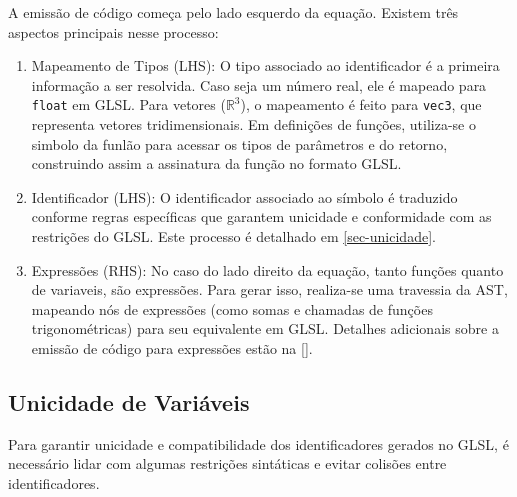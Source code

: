 A emissão de código começa pelo lado esquerdo da equação. Existem três aspectos principais nesse processo:
\begin{enumerate}
    \item Mapeamento de Tipos (LHS): O tipo associado ao identificador é a primeira informação a ser resolvida. Caso seja um número real, ele é mapeado para \verb"float" em GLSL. Para vetores ($\mathbb{R}^3$), o mapeamento é feito para \verb"vec3", que representa vetores tridimensionais. Em definições de funções, utiliza-se o simbolo da funlão para acessar os tipos de parâmetros e do retorno, construindo assim a assinatura da função no formato GLSL.

    \item Identificador (LHS): O identificador associado ao símbolo é traduzido conforme regras específicas que garantem unicidade e conformidade com as restrições do GLSL. Este processo é detalhado em \autoref{sec-unicidade}.

    \item Expressões (RHS): No caso do lado direito da equação, tanto funções quanto de variaveis, são expressões. Para gerar isso, realiza-se uma travessia da AST, mapeando nós de expressões (como somas e chamadas de funções trigonométricas) para seu equivalente em GLSL. Detalhes adicionais sobre a emissão de código para expressões estão na \autoref{}.
\end{enumerate}





\subsection{Unicidade de Variáveis} \label{sec-unicidade}

Para garantir unicidade e compatibilidade dos identificadores gerados no GLSL, é necessário lidar com algumas restrições sintáticas e evitar colisões entre identificadores.

